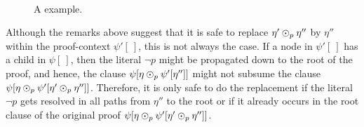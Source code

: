 \begin{figure*}%
\centering
{}\\%
%

\caption{A {\RPI} example.}
\label{ex:rpi-example}
\end{figure*}


Although the remarks above suggest that it is safe to replace $\eta' \odot_p
\eta''$ by $\eta''$ within the proof-context $\psi'[\ ]$, this is not always the
case. If a node in $\psi'[\ ]$ has a child in $\psi[\ ]$, then the literal $\neg
p$ might be propagated down to the root of the proof, and hence, the clause
$\psi[ \eta \odot_p \psi'[ \eta''] ]$ might not subsume the clause $\psi[ \eta
\odot_p \psi'[\eta' \odot_p \eta''] ]$. Therefore, it is only safe to do the
replacement if the literal $\neg p$ gets resolved in all paths from $\eta''$ to the root or if it already occurs in the root clause of the original proof $\psi[ \eta \odot_p \psi'[\eta' \odot_p \eta''] ]$.

